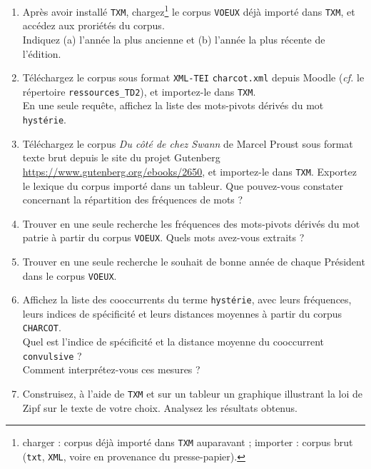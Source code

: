 \documentclass[xcolor={table,usenames,dvipsnames}]{article}
\begin{document}
	\begin{enumerate}
		\item Après avoir installé \texttt{TXM}, chargez\footnote{charger : corpus déjà importé dans \texttt{TXM} auparavant ; importer : corpus brut (\texttt{txt}, \texttt{XML}, voire en provenance du presse-papier).} le corpus \texttt{VOEUX} déjà importé dans \texttt{TXM}, et accédez aux proriétés du corpus. \\
		Indiquez (a) l'année la plus ancienne et (b) l'année la plus récente de l'édition.
		\item Téléchargez le corpus sous format \texttt{XML-TEI} \texttt{charcot.xml} depuis Moodle (\textit{cf.} le répertoire \texttt{ressources\_TD2}), et importez-le dans \texttt{TXM}.\\
		En une seule requête, affichez la liste des mots-pivots dérivés du mot \texttt{hystérie}.
		\item Téléchargez le corpus \textit{Du côté de chez Swann} de Marcel Proust sous format texte brut depuis le site du projet Gutenberg \url{https://www.gutenberg.org/ebooks/2650}, et importez-le dans \texttt{TXM}. Exportez le lexique du corpus importé dans un tableur. Que pouvez-vous constater concernant la répartition des fréquences de mots ?
		\item Trouver en une seule recherche les fréquences des mots-pivots dérivés du mot \og{}patrie\fg{} à partir du corpus \texttt{VOEUX}. Quels mots avez-vous extraits ?
		\item Trouver en une seule recherche le souhait de bonne année de chaque Président dans le corpus \texttt{VOEUX}.
		\item Affichez la liste des cooccurrents du terme \texttt{hystérie}, avec leurs fréquences, leurs indices de spécificité et leurs distances moyennes à partir du corpus \texttt{CHARCOT}.\\
		Quel est l'indice de spécificité et la distance moyenne du cooccurrent \texttt{convulsive} ?\\
		Comment interprétez-vous ces mesures ?
		\item Construisez, à l’aide de \texttt{TXM} et sur un tableur un graphique illustrant la loi de Zipf sur le texte de votre choix. Analysez les résultats obtenus.
	
	\end{enumerate}
	
	\bigskip
	
\end{document}
